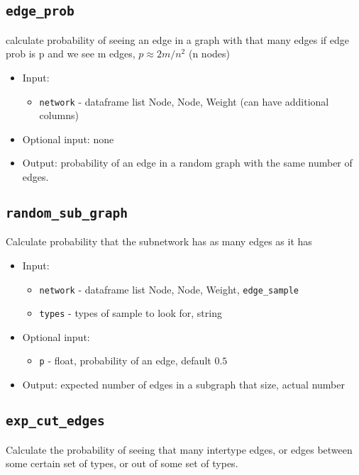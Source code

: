 \documentclass[10pt]{article}
\theoremstyle{definition}
\numberwithin{theorem}{section}
\numberwithin{definition}{section}
\numberwithin{lemma}{section}
\numberwithin{corollary}{section}
\numberwithin{clm}{section}
\numberwithin{rmk}{section}
\begin{document}
\cprotect \subsection{\verb|edge_prob|}
calculate probability of seeing an edge in a graph with that many edges
if edge prob is p and we see m edges, $p \approx  2m/n^2$ (n nodes)
\begin{itemize}
	\item Input: 
	\begin{itemize}
		\item \verb|network| - dataframe list Node, Node, Weight (can have additional columns)
	\end{itemize}
	\item Optional input: none
	\item Output: probability of an edge in a random graph with the same number of edges.
\end{itemize}

\cprotect \subsection{\verb|random_sub_graph|}
Calculate probability that the subnetwork has as many edges as it has
\begin{itemize}
	\item Input: 
		\begin{itemize}
		\item \verb|network| - dataframe list Node, Node, Weight, \verb|edge_sample|
		\item \verb|types| - types of sample to look for, string
	\end{itemize}
	\item Optional input: 
	\begin{itemize}
		\item 	\verb|p| - float, probability of an edge, default $0.5$
	\end{itemize}
	\item Output: expected number of edges in a subgraph that size, actual number
\end{itemize}

\cprotect \subsection{\verb|exp_cut_edges|}
Calculate the probability of seeing that many intertype edges, or edges between some
certain set of types, or out of some set of types.
\end{document}
